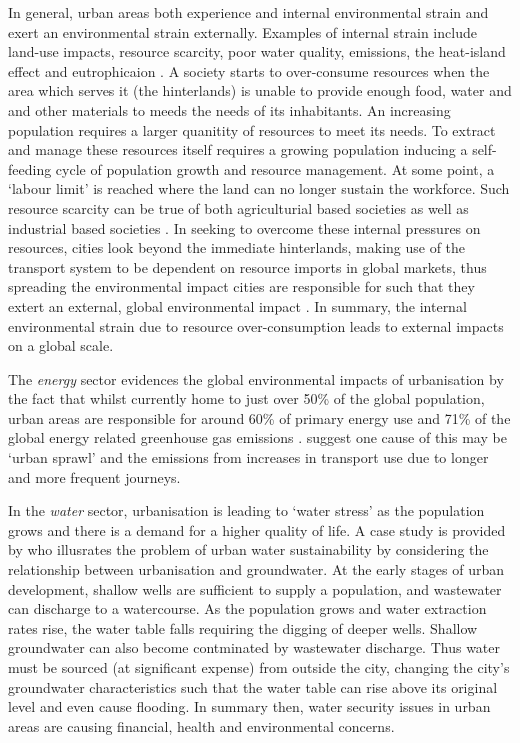 In general, urban areas both experience and internal environmental strain and exert an environmental strain externally. Examples of internal strain include land-use impacts, resource scarcity, poor water quality, emissions, the heat-island effect and eutrophicaion \citep{Cao2011}. A society starts to over-consume resources when the area which serves it (the hinterlands) is unable to provide enough food, water and and other materials to meeds the needs of its inhabitants. An increasing population requires a larger quanitity of resources to meet its needs. To extract and manage these resources itself requires a growing population inducing a self-feeding cycle of population  growth and resource management. At some point, a `labour limit' is reached where the land can no longer sustain the workforce. Such resource scarcity can be true of both agriculturial based societies as well as industrial based societies \citep{Haberl2001a, Haberl2001, Gr2003}. In seeking to overcome these internal pressures on resources, cities look beyond the immediate hinterlands, making use of the transport system to be dependent on resource imports in global markets, thus spreading the environmental impact cities are responsible for such that they extert an external, global environmental impact \citep{Agudelo-Vera2011}. In summary, the internal environmental strain due to resource over-consumption leads to external impacts on a global scale.

The \emph{energy} sector evidences the global environmental impacts of urbanisation by the fact that whilst currently home to just over 50\% of the global population, urban areas are responsible for around 60\% of primary energy use and 71\% of the global energy related greenhouse gas emissions \citep{IEA2008}. \citet{Grubler2009} suggest one cause of this may be `urban sprawl' and the emissions from increases in transport use due to longer and more frequent journeys.

In the \emph{water} sector, urbanisation is leading to `water stress' as the population grows and there is a demand for a higher quality of life. A case study is provided by \citet{Kennedy2008} who illusrates the problem of urban water sustainability by considering the relationship between urbanisation and groundwater. At the early stages of urban development, shallow wells are sufficient to supply a population, and wastewater can discharge to a watercourse. As the population grows and water extraction rates rise, the water table falls requiring the digging of deeper wells. Shallow groundwater can also become contminated by wastewater discharge. Thus water must be sourced (at significant expense) from outside the city, changing the city's groundwater characteristics such that the water table can rise above its original level and even cause flooding. In summary then, water security issues in urban areas are causing financial, health and environmental concerns.

